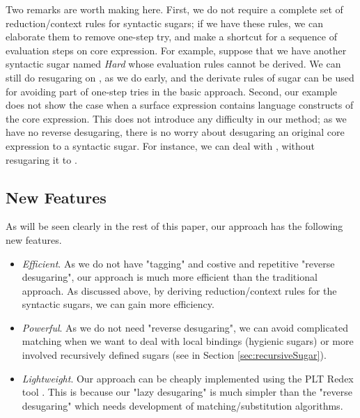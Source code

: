 Two remarks are worth making here. First, we do not require a complete set of reduction/context rules for syntactic sugars; if we have these rules, we can elaborate them to remove one-step try, and make a shortcut for a sequence of evaluation steps on core expression.
For example, suppose that we have another syntactic sugar named \emph{Hard} whose evaluation rules cannot be derived.
We can still do resugaring on , as we do early, and the derivate rules of  sugar can be used for avoiding part of one-step tries in the basic approach.
Second, our example does not show the case when a surface expression contains language constructs of the core expression. This does not introduce any difficulty in our method; as we have no reverse desugaring, there is no worry about desugaring an original core expression to a syntactic sugar. For instance, we can deal with , without resugaring it to .


\subsection{New Features}

As will be seen clearly in the rest of this paper, our approach has the following new features.
\begin{itemize}
  \item {\em Efficient}. As we do not have "tagging" and costive and repetitive "reverse desugaring", our approach is much more efficient than the traditional approach. As discussed above, by deriving reduction/context rules for the syntactic sugars, we can gain more efficiency.

  \item {\em Powerful}. As we do not need "reverse desugaring", we can avoid complicated matching when we want to deal with local bindings (hygienic sugars) or more involved recursively defined sugars (see  in Section \ref{sec:recursiveSugar}).

  \item {\em Lightweight}. Our approach can be cheaply implemented using the PLT Redex tool \cite{SEwPR}. This is because our "lazy desugaring" is much simpler than the "reverse desugaring" which needs development of matching/substitution algorithms.

\end{itemize}
